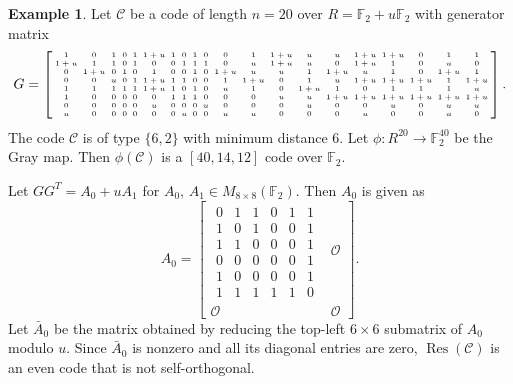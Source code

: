 \documentclass{article}
\theoremstyle{definition}
\newtheorem{example}{Example}[section]
\theoremstyle{remark}
\begin{document}
\begin{example}\label{even-case1}
    Let $\mathcal{C}$ be a code of length $n=20$ over $R=\mathbb{F}_2+u\mathbb{F}_2$ with generator matrix
    \[
    \begingroup
    \setlength{\arraycolsep}{2pt}
    \tiny
    G=\left[
    \begin{array}{cccccccccccccccccccc}
    1&0&1&0&1&1+u&1&0&1&0&0&1&1+u&u&u&1+u&1+u&0&1&1\\
    1+u&1&1&0&1&0&0&1&1&1&0&u&1+u&u&0&1+u&1&0&u&0\\
    0&1+u&0&1&0&1&0&0&1&0&1+u&u&u&1&1+u&u&1&0&1+u&1\\
    0&0&u&0&1&1+u&1&1&0&0&1&1+u&0&1&u&1+u&1+u&1+u&1&1+u\\
    1&1&1&1&1&1+u&1&0&1&0&u&1&0&1+u&1&0&1&1&1&u\\
    1&0&0&0&0&0&1&1&1&0&0&0&u&u&1+u&1+u&1+u&1+u&1+u&1+u\\
    0&0&0&0&0&u&0&0&0&u&0&0&0&u&0&0&u&0&u&u\\
    u&0&0&0&0&0&0&u&0&0&u&u&0&0&0&u&0&0&u&0
    \end{array}
    \right].
    \endgroup
    \]
    The code $\mathcal{C}$ is of type $\{6, 2\}$ with minimum distance 6. Let $\phi:R^{20}\to \mathbb{F}_2^{40}$ be the Gray map. Then $\phi(\mathcal{C})$ is a $[40, 14, 12]$ code over $\mathbb{F}_2$.
    
    Let $GG^T=A_0+uA_1$ for $A_0,\,A_1\in M_{8\times 8}(\mathbb{F}_2)$. Then $A_0$ is given as
    \[
    A_0=\left[
    \begin{array}{c|c}
        \begin{matrix}
            0 & 1 & 1 & 0 & 1 & 1\\
            1 & 0 & 1 & 0 & 0 & 1\\
            1 & 1 & 0 & 0 & 0 & 1\\
            0 & 0 & 0 & 0 & 0 & 1\\
            1 & 0 & 0 & 0 & 0 & 1\\
            1 & 1 & 1 & 1 & 1 & 0
        \end{matrix} & \mathcal{O}\\\hline
        \mathcal{O} & \mathcal{O}
    \end{array}
    \right].
    \]
    Let $\bar{A}_0$ be the matrix obtained by reducing the top-left $6\times 6$ submatrix of $A_0$ modulo $u$. Since $\bar{A}_0$ is nonzero and all its diagonal entries are zero, $\operatorname{Res}(\mathcal{C})$ is an even code that is not self-orthogonal. 
    

\end{example}
\end{document}
